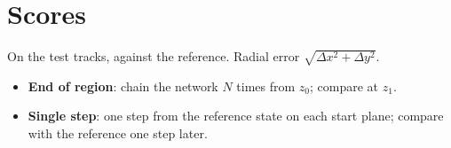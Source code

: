 \documentclass[11pt,a4paper]{article}
\begin{document}
\section{Scores}

On the test tracks, against the reference. Radial error $\sqrt{\Delta x^2 + \Delta y^2}$.
\begin{itemize}
\item \textbf{End of region}: chain the network $N$ times from $z_0$; compare at $z_1$.
\item \textbf{Single step}: one step from the reference state on each start plane; compare with the reference one step later.
\end{itemize}
\end{document}
